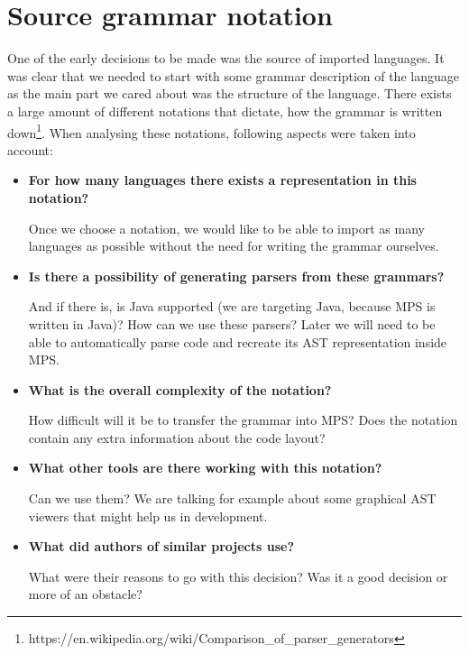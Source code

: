 \chapter{Source grammar notation}
\label{chap:source_grammar_notation}

One of the early decisions to be made was the source of imported languages. It was clear that we needed to start with some grammar description of the language as the main part we cared about was the structure of the language. There exists a large amount of different notations that dictate, how the grammar is written down\footnote{https://en.wikipedia.org/wiki/Comparison{\_}of{\_}parser{\_}generators}. When analysing these notations, following aspects were taken into account:

\begin{itemize}
	\item \textbf{For how many languages there exists a representation in this notation?} 
	
	Once we choose a notation, we would like to be able to import as many languages as possible without the need for writing the grammar ourselves.
	
	\item \textbf{Is there a possibility of generating parsers from these grammars?} 
	
	And if there is, is Java supported (we are targeting Java, because MPS is written in Java)? How can we use these parsers? Later we will need to be able to automatically parse code and recreate its AST representation inside MPS. 
	
	\item \textbf{What is the overall complexity of the notation?}
	
	How difficult will it be to transfer the grammar into MPS? Does the notation contain any extra information about the code layout?
	
	\item \textbf{What other tools are there working with this notation?}
	
	Can we use them? We are talking for example about some graphical AST viewers that might help us in development.
	
	\item \textbf{What did authors of similar projects use?}
	
	What were their reasons to go with this decision? Was it a good decision or more of an obstacle?
\end{itemize}

